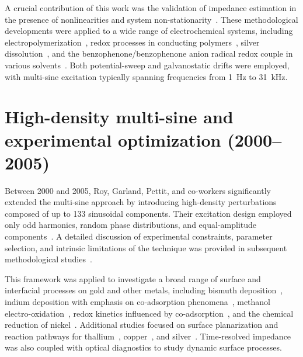 A crucial contribution of this work was the validation of impedance estimation in the presence of nonlinearities and system non-stationarity~\cite{popkirovValidationExperimentalData1993a, popkirovEffectSampleNonlinearity1995a}.
These methodological developments were applied to a wide range of electrochemical systems, including electropolymerization~\cite{popkirovInSituTimeResolved1993}, redox processes in conducting polymers~\cite{popkirovInsituImpedanceMeasurements1995, popkirovElectrochemicalImpedanceSpectroscopy1995, popkirovInvestigationConductingPolymer1997, garcia-belmonteDeterminationElectronicConductivity2003a}, silver dissolution~\cite{popkirovElectrodePotentialRedistribution1995, baltrunasTimeEvolutionActive1997}, and the benzophenone/benzophenone anion radical redox couple in various solvents~\cite{walczykInvestigationRedoxCouple1995}.
Both potential-sweep and galvanostatic drifts were employed, with multi-sine excitation typically spanning frequencies from 1~Hz to 31~kHz.

\section*{High-density multi-sine and experimental optimization (2000--2005)}

Between 2000 and 2005, Roy, Garland, Pettit, and co-workers significantly extended the multi-sine approach by introducing high-density perturbations composed of up to 133 sinusoidal components.
Their excitation design employed only odd harmonics, random phase distributions, and equal-amplitude components~\cite{waltersWeakAdsorptionAnions2001a}.
A detailed discussion of experimental constraints, parameter selection, and intrinsic limitations of the technique was provided in subsequent methodological studies~\cite{garlandAnalysisExperimentalConstraints2004}.

This framework was applied to investigate a broad range of surface and interfacial processes on gold and other metals, including bismuth deposition~\cite{garlandKineticAnalysisElectrosorption2002a}, indium deposition with emphasis on co-adsorption phenomena~\cite{pettitElectrodepositionIndiumMolybdenum2002}, methanol electro-oxidation~\cite{assiongbonElectrooxidationMethanolGold2005}, redox kinetics influenced by co-adsorption~\cite{emeryTimeResolvedImpedance2005}, and the chemical reduction of nickel~\cite{shiElectrocatalysisHypophosphiteNickel2014}.
Additional studies focused on surface planarization and reaction pathways for thallium~\cite{assiongbonChemicalRolesPeroxidebased2004, gorantlaChemicalEffectsChemical2005, pettitRoleIodateIons2005}, copper~\cite{luRelativeRoles22004, pettitTimeResolvedStudy2004, gorantlaCitricAcidComplexing2005}, and silver~\cite{assiongbonElectrooxidationMethanolGold2005}.
Time-resolved impedance was also coupled with optical diagnostics to study dynamic surface processes.

